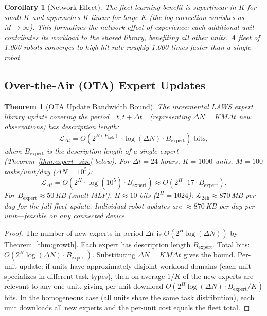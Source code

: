 \documentclass[11pt]{article}
\newtheorem{theorem}{Theorem}
\newtheorem{corollary}{Corollary}
\begin{document}
\begin{corollary}[Network Effect]
The fleet learning benefit is superlinear in $K$ for small $K$ and approaches
$K$-linear for large $K$ (the log correction vanishes as $M \to \infty$).
This formalizes the \emph{network effect of experience}: each additional unit
contributes its workload to the shared library, benefiting all other units.
A fleet of 1,000 robots converges to high hit rate roughly 1,000 times faster
than a single robot.
\end{corollary}

\subsection{Over-the-Air (OTA) Expert Updates}

\begin{theorem}[OTA Update Bandwidth Bound]
\label{thm:ota}
The incremental LAWS expert library update covering the period $[t, t+\Delta t]$
(representing $\Delta N = KM \Delta t$ new observations) has description length:
\[
  \mathcal{L}_{\Delta t}
  = O\!\left(2^{H(P_{\mathrm{task}})} \cdot \log(\Delta N)
  \cdot B_{\mathrm{expert}}\right) \text{ bits},\]
where $B_{\mathrm{expert}}$ is the description length of a single expert
(Theorem~\ref{thm:expert_size} below).  For $\Delta t = 24$ hours,
$K = 1000$ units, $M = 100$ tasks/unit/day ($\Delta N = 10^5$):
\[
  \mathcal{L}_{\Delta t} = O\!\left(2^H \cdot \log(10^5) \cdot
  B_{\mathrm{expert}}\right) \approx O(2^H \cdot 17 \cdot B_{\mathrm{expert}}).
\]
For $B_{\mathrm{expert}} \approx 50$\,KB (small MLP), $H \approx 10$ bits
($2^H = 1024$): $\mathcal{L}_{24\mathrm{h}} \approx 870$\,MB per day for the
full fleet update.  Individual robot updates are $\approx 870$\,KB per day
per unit---feasible on any connected device.
\end{theorem}

\begin{proof}
The number of new experts in period $\Delta t$ is $O(2^H \log(\Delta N))$ by
Theorem~\ref{thm:growth}.  Each expert has description length $B_{\mathrm{expert}}$.
Total bits: $O(2^H \log(\Delta N) \cdot B_{\mathrm{expert}})$.  Substituting
$\Delta N = KM\Delta t$ gives the bound.
Per-unit update: if units have approximately disjoint workload domains
(each unit specializes in different task types), then on average $1/K$ of the new experts are relevant to any one unit, giving per-unit download
$O(2^H \log(\Delta N) \cdot B_{\mathrm{expert}} / K)$ bits.  In the homogeneous case (all units share the same task distribution),
each unit downloads all new experts and the per-unit cost equals the fleet total.
\end{proof}
\end{document}

